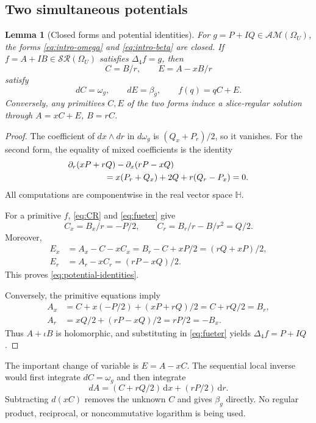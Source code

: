 \documentclass[11pt,a4paper]{article}
\numberwithin{equation}{section}
\newtheorem{lemma}[theorem]{Lemma}
\theoremstyle{definition}
\theoremstyle{remark}
\newcommand{\HH}{\mathbb H}
\newcommand{\SR}{\mathcal{SR}}
\newcommand{\AM}{\mathcal{AM}}
\newcommand{\Fu}{\Delta_4}
\newcommand{\dd}{\,\mathrm d}
\begin{document}
\subsection{Two simultaneous potentials}
\begin{lemma}[Closed forms and potential identities]\label{lem:forms}
For $g=P+IQ\in\AM(\Omega_U)$, the forms
\eqref{eq:intro-omega} and \eqref{eq:intro-beta} are closed.
If $f=A+IB\in\SR(\Omega_U)$ satisfies $\Fu f=g$, then
\begin{equation}
 C=B/r,\qquad E=A-xB/r\label{eq:CE}
\end{equation}
satisfy
\begin{equation}
 dC=\omega_g,\qquad dE=\beta_g,\qquad f(q)=qC+E.
 \label{eq:potential-identities}
\end{equation}
Conversely, any primitives $C,E$ of the two forms induce a slice-regular
solution through $A=xC+E$, $B=rC$.
\end{lemma}
\begin{proof}
The coefficient of $dx\wedge dr$ in $d\omega_g$ is
$(Q_x+P_r)/2$, so it vanishes. For the second form, the equality of mixed
coefficients is the identity
\begin{align*}
 &\partial_r(xP+rQ)-\partial_x(rP-xQ)\\
 &\hspace{15mm}=x(P_r+Q_x)+2Q+r(Q_r-P_x)=0.
\end{align*}
All computations are componentwise in the real vector space $\HH$.

For a primitive $f$, \eqref{eq:CR} and \eqref{eq:fueter} give
\[
 C_x=B_x/r=-P/2,\qquad C_r=B_r/r-B/r^2=Q/2.
\]
Moreover,
\begin{align*}
 E_x&=A_x-C-xC_x
     =B_r-C+xP/2=(rQ+xP)/2,\\
 E_r&=A_r-xC_r=(rP-xQ)/2.
\end{align*}
This proves \eqref{eq:potential-identities}.

Conversely, the primitive equations imply
\begin{align*}
 A_x&=C+x(-P/2)+(xP+rQ)/2=C+rQ/2=B_r,\\
 A_r&=xQ/2+(rP-xQ)/2=rP/2=-B_x.
\end{align*}
Thus $A+\iota B$ is holomorphic, and substituting in
\eqref{eq:fueter} yields $\Fu f=P+IQ$.
\end{proof}

The important change of variable is $E=A-xC$. The sequential local inverse
would first integrate $dC=\omega_g$ and then integrate
\[
 dA=(C+rQ/2)\dd x+(rP/2)\dd r.
\]
Subtracting $d(xC)$ removes the unknown $C$ and gives $\beta_g$ directly.
No regular product, reciprocal, or noncommutative logarithm is being used.
\end{document}

